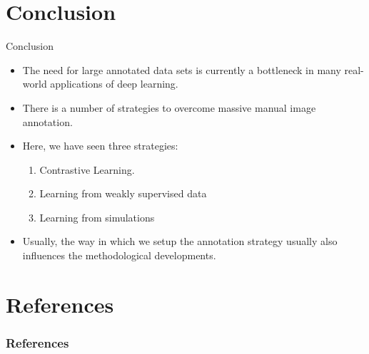 \documentclass[xcolor=pdftex,dvipsnames,table]{beamer}
\begin{document}








\section{Conclusion}

\begin{frame}{Conclusion}
\begin{itemize}
   \item The need for large annotated data sets is currently a bottleneck in many real-world applications of deep learning. 
   \item There is a number of strategies to overcome massive manual image annotation. 
   \item Here, we have seen three strategies:
   \begin{enumerate}
      \item Contrastive Learning. 
      \item Learning from weakly supervised data
      \item Learning from simulations
   \end{enumerate}
   \item Usually, the way in which we setup the annotation strategy usually also influences the methodological developments. 
\end{itemize}
\end{frame}

\section{References}
\begin{frame}[allowframebreaks]
	\frametitle{References}
	
\end{frame}
\end{document}
